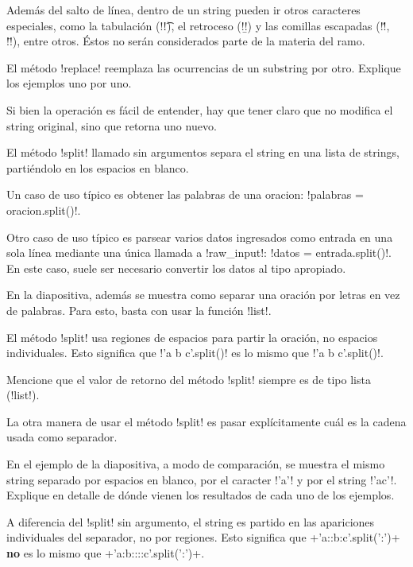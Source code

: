 \documentclass[10pt]{article}
\begin{document}
  Además del salto de línea,
  dentro de un string pueden ir otros caracteres especiales,
  como la tabulación (\li!\t!), el retroceso (\li!\b!)
  y las comillas escapadas (\li!\'!, \li!\"!), entre otros.
  Éstos no serán considerados parte de la materia del ramo.


  El método \li!replace!
  reemplaza las ocurrencias de un substring por otro.
  Explique los ejemplos uno por uno.

  Si bien la operación es fácil de entender,
  hay que tener claro que no modifica el string original,
  sino que retorna uno nuevo.


  El método \li!split! llamado sin argumentos
  separa el string en una lista de strings,
  partiéndolo en los espacios en blanco.

  Un caso de uso típico
  es obtener las palabras de una oracion: \li!palabras = oracion.split()!.

  Otro caso de uso típico
  es parsear varios datos ingresados como entrada en una sola línea
  mediante una única llamada a \li!raw_input!:
  \li!datos = entrada.split()!.
  En este caso, suele ser necesario convertir los datos al tipo apropiado.

  En la diapositiva,
  además se muestra como separar una oración por letras en vez de palabras.
  Para esto, basta con usar la función \li!list!.

  El método \li!split! usa regiones de espacios para partir la oración,
  no espacios individuales.
  Esto significa que \li!'a    b       c'.split()!
  es lo mismo que \li!'a b c'.split()!.

  Mencione que el valor de retorno del método \li!split!
  siempre es de tipo lista (\li!list!).


  La otra manera de usar el método \li!split!
  es pasar explícitamente cuál es la cadena usada como separador.

  En el ejemplo de la diapositiva, a modo de comparación,
  se muestra el mismo string separado por espacios en blanco,
  por el caracter \li!'a'! y por el string \li!'ac'!.
  Explique en detalle de dónde vienen los resultados de cada uno
  de los ejemplos.

  A diferencia del \li!split! sin argumento,
  el string es partido en las apariciones individuales del separador,
  no por regiones.
  Esto significa que \li+'a::b:c'.split(':')+
  \textbf{no} es lo mismo que \li+'a:b::::c'.split(':')+.
\end{document}
